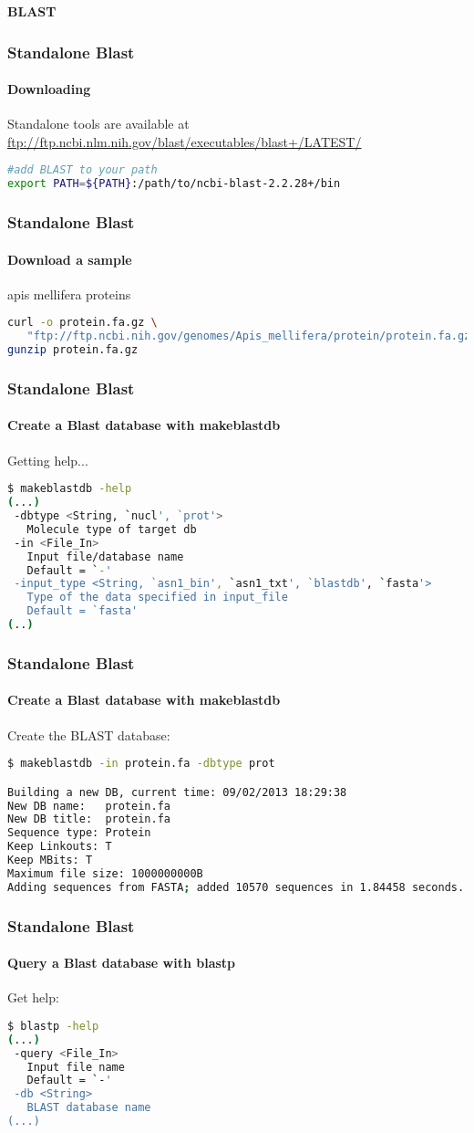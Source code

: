 \documentclass{beamer}
\newcommand{\centeredtitle}[1]{
\begin{center}
    \Huge{\bf{#1}}
\end{center}
}
\newcommand{\hugeslide}[1]{
\begin{frame}
\centeredtitle{#1}
\end{frame}
}
\begin{document}
\hugeslide{BLAST}

\begin{frame}[fragile]
\frametitle{Standalone Blast}
\framesubtitle{Downloading}
Standalone tools are available at \url{ftp://ftp.ncbi.nlm.nih.gov/blast/executables/blast+/LATEST/}
\begin{lstlisting}[language=bash]
#add BLAST to your path
export PATH=${PATH}:/path/to/ncbi-blast-2.2.28+/bin
\end{lstlisting}
\end{frame}


\begin{frame}[fragile]
\frametitle{Standalone Blast}
\framesubtitle{Download a sample}
apis mellifera proteins
\begin{lstlisting}[language=bash,basicstyle=\tiny,breaklines=true]
curl -o protein.fa.gz \
   "ftp://ftp.ncbi.nih.gov/genomes/Apis_mellifera/protein/protein.fa.gz"
gunzip protein.fa.gz
\end{lstlisting}
\end{frame}


\begin{frame}[fragile]
\frametitle{Standalone Blast}
\framesubtitle{Create a Blast database with makeblastdb}
Getting help...
\begin{lstlisting}[language=bash]
$ makeblastdb -help
(...)
 -dbtype <String, `nucl', `prot'>
   Molecule type of target db
 -in <File_In>
   Input file/database name
   Default = `-'
 -input_type <String, `asn1_bin', `asn1_txt', `blastdb', `fasta'>
   Type of the data specified in input_file
   Default = `fasta'
(..)
\end{lstlisting}
\end{frame}


\begin{frame}[fragile]
\frametitle{Standalone Blast}
\framesubtitle{Create a Blast database with makeblastdb}
Create the BLAST database:
\begin{lstlisting}[language=bash]
$ makeblastdb -in protein.fa -dbtype prot

Building a new DB, current time: 09/02/2013 18:29:38
New DB name:   protein.fa
New DB title:  protein.fa
Sequence type: Protein
Keep Linkouts: T
Keep MBits: T
Maximum file size: 1000000000B
Adding sequences from FASTA; added 10570 sequences in 1.84458 seconds.
\end{lstlisting}
\end{frame}

\begin{frame}[fragile]
\frametitle{Standalone Blast}
\framesubtitle{Query a Blast database with blastp}
Get help:
\begin{lstlisting}[language=bash]
$ blastp -help
(...)
 -query <File_In>
   Input file name
   Default = `-'
 -db <String>
   BLAST database name
(...)
\end{lstlisting}
\end{frame}
\end{document}
